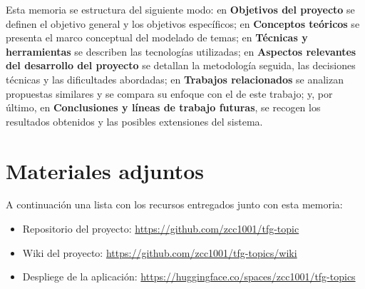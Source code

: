 Esta memoria se estructura del siguiente modo: en \textbf{Objetivos del
      proyecto} se definen el objetivo general y los objetivos específicos; en
\textbf{Conceptos teóricos} se presenta el marco conceptual del modelado de
temas; en \textbf{Técnicas y herramientas} se describen las tecnologías
utilizadas; en \textbf{Aspectos relevantes del desarrollo del proyecto} se
detallan la metodología seguida, las decisiones técnicas y las dificultades
abordadas; en \textbf{Trabajos relacionados} se analizan propuestas similares y
se compara su enfoque con el de este trabajo; y, por último, en
\textbf{Conclusiones y líneas de trabajo futuras}, se recogen los resultados
obtenidos y las posibles extensiones del sistema.

\section{Materiales adjuntos}
A continuación una lista con los recursos entregados junto con esta memoria:

\begin{itemize}
      \item Repositorio del proyecto: \url{https://github.com/zcc1001/tfg-topic}
      \item Wiki del proyecto: \url{https://github.com/zcc1001/tfg-topics/wiki}
      \item Despliege de la aplicación:
            \url{https://huggingface.co/spaces/zcc1001/tfg-topics}
\end{itemize}
